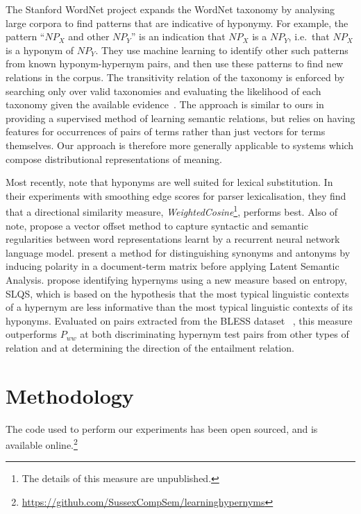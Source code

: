 \documentclass[11pt]{article}
\begin{document}
The Stanford WordNet project \cite{Snow:04} expands the WordNet
taxonomy by analysing large corpora to find patterns that are
indicative of hyponymy. For example, the pattern ``$\mathit{NP}_X$ and
other $\mathit{NP}_Y$'' is an indication that $\mathit{NP}_X$ is a
$\mathit{NP}_Y$, i.e.~that $\mathit{NP}_X$ is a hyponym of
$\mathit{NP}_Y$. They use machine learning to identify other such
patterns from known hyponym-hypernym pairs, and then use these
patterns to find new relations in the corpus. The
transitivity relation of the taxonomy is enforced by searching only over valid
taxonomies and evaluating the likelihood of each taxonomy given the
available evidence~\cite{Snow:06}. The approach is similar to
ours in providing a supervised method of learning semantic relations, but relies on having features for occurrences of pairs of terms rather than just vectors for terms themselves. Our approach is therefore more generally applicable to systems which compose distributional
representations of meaning.

Most recently,  note that hyponyms are well suited for lexical substitution.  In their experiments with smoothing edge scores for parser lexicalisation, they find that a directional similarity measure,  \emph{WeightedCosine}\footnote{The details of this measure are unpublished.}, performs best.  Also of note,  propose a vector offset method to capture syntactic and semantic regularities between word representations learnt by a recurrent neural network language model.   present a method for distinguishing synonyms and antonyms by inducing polarity in a document-term matrix before applying Latent Semantic Analysis.   propose identifying hypernyms using a new measure based on entropy, SLQS, which is based on the hypothesis that the most typical linguistic contexts of a hypernym are less informative than the most typical linguistic contexts of its hyponyms.  Evaluated on pairs extracted from the BLESS dataset ~\cite{Baroni2011}, this measure outperforms $P_{ww}$ at both discriminating hypernym test pairs from other types of relation and at determining the direction of the entailment relation.


\section{Methodology}

The code used to perform our experiments has been open sourced, and is
available online.\footnote{\url{https://github.com/SussexCompSem/learninghypernyms}}
\end{document}
